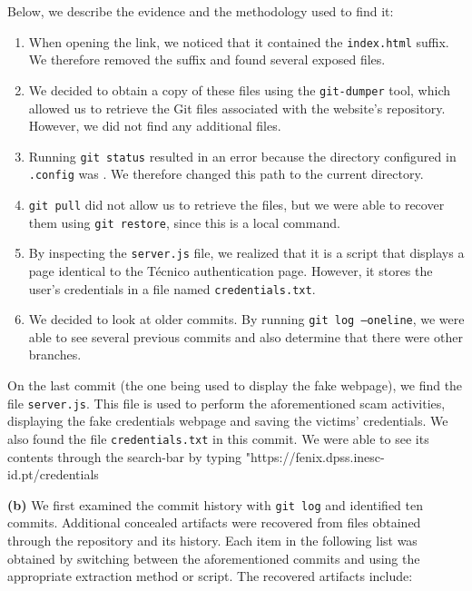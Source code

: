 \documentclass[11pt,a4paper,final,oneside]{article}
\begin{document}
Below, we describe the evidence and the methodology used to find it:
\begin{enumerate}
  \item When opening the link, we noticed that it contained the \texttt{index.html} suffix. We therefore removed the suffix and found several exposed files.
  \item We decided to obtain a copy of these files using the \texttt{git-dumper} tool, which allowed us to retrieve the Git files associated with the website's repository. However, we did not find any additional files.
  \item Running \texttt{git status} resulted in an error because the directory configured in \texttt{.config} was . We therefore changed this path to the current directory.
  \item \texttt{git pull} did not allow us to retrieve the files, but we were able to recover them using \texttt{git restore}, since this is a local command.
  \item By inspecting the \texttt{server.js} file, we realized that it is a script that displays a page identical to the T\'ecnico authentication page. However, it stores the user's credentials in a file named \texttt{credentials.txt}.
  \item We decided to look at older commits. By running \texttt{git log --oneline}, we were able to see several previous commits and also determine that there were other branches.
\end{enumerate}

On the last commit (the one being used to display the fake webpage), we find the file \texttt{server.js}.
This file is used to perform the aforementioned scam activities, displaying the fake credentials webpage and saving the victims' credentials.
We also found the file \texttt{credentials.txt} in this commit. We were able to see its contents through the search-bar by typing "https://fenix.dpss.inesc-id.pt/credentials%

\textbf{(b)}
We first examined the commit history with \texttt{git log} and identified ten
commits. Additional concealed artifacts were recovered from files obtained
through the repository and its history. Each item in the following list was
obtained by switching between the aforementioned commits and using the
appropriate extraction method or script. The recovered artifacts include:
\end{document}
